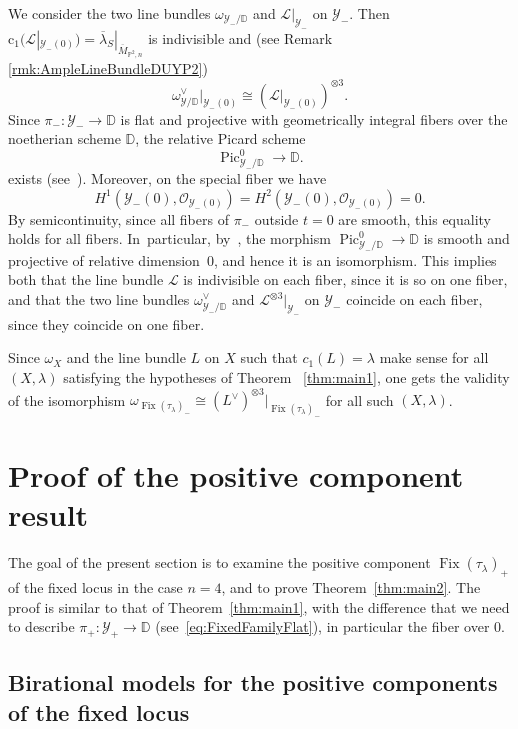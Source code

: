 \documentclass[JEP,XML,SOM,Unicode,published]{cedram}
\newcommand{\DD}{{\mathbb D}}
\newcommand{\PP}{{\mathbb P}}\let\P\PP
\newcommand\cL{\mathcal{L}}
\newcommand\cO{\mathcal{O}}
\newcommand\cY{\mathcal{Y}}
\DeclareMathOperator{\Fix}{Fix}
\DeclareMathOperator{\Pic}{Pic}
\theoremstyle{definition}
\begin{document}
We consider the two line bundles $\omega_{\cY_-/\DD}$ and $\cL |_{\cY_-}$ on $\cY_-$.
Then $\mathrm{c}_1(\cL |_{\cY_{-}(0)})=\overline{\lambda}{}_S|_{\overline{M}_{\PP^2,n}}$ is indivisible and (see Remark \ref{rmk:AmpleLineBundleDUYP2})
\[
\omega_{\cY/\DD}^\vee |_{\cY_{-}(0)} \cong \left(\cL |_{\cY_{-}(0)}\right)^{\otimes 3}.
\]
Since $\pi_-\colon\cY_-\to \DD$ is flat and projective with geometrically integral fibers over the noetherian scheme $\DD$, the relative Picard scheme
\[
\Pic_{\cY_-/\DD}^0\to \DD.
\]
exists (see~\cite[Th.\,4.8]{Kleiman:Picard}).
Moreover, on the special fiber we have
\[
H^1(\cY_{-}(0),\cO_{\cY_{-}(0)})=H^2(\cY_{-}(0),\cO_{\cY_{-}(0)})=0.
\]
By semicontinuity, since all fibers of $\pi_-$ outside $t=0$ are smooth, this equality holds for all fibers. In~particular, by~\cite[Prop.\,5.19]{Kleiman:Picard}, the morphism $\Pic_{\cY_-/\DD}^0\to \DD$ is smooth and projective of relative dimension~0, and hence it is an isomorphism.
This implies both that the line bundle $\cL$ is indivisible on each fiber, since it is so on one fiber, and that the two line bundles $\omega_{\cY_-/\DD}^\vee$ and $\cL^{\otimes 3} |_{\cY_-}$ on $\cY_-$ coincide on each fiber, since they coincide on one fiber.

Since $\omega_X$ and the line bundle $L$ on $X$ such that $c_1(L)=\lambda$ make sense for all $(X,\lambda)$ satisfying the hypotheses of Theorem ~\ref{thm:main1}, one gets the validity of the isomorphism $\omega_{\Fix(\tau_{\lambda})_-}\cong (L^{\vee})^{\otimes 3}\vert_{\Fix(\tau_{\lambda})_-}$ for all such $(X, \lambda)$.

\section{Proof of the positive component result}\label{sec:cubic4folds}

The goal of the present section is to examine the positive component $\Fix(\tau_{\lambda})_+$ of the fixed locus in the case $n=4$, and to prove Theorem~\ref{thm:main2}.
The proof is similar to that of Theorem~\ref{thm:main1}, with the difference that we need to describe $\pi_{+}\colon \cY_{+}\to\DD$ (see~\eqref{eq:FixedFamilyFlat}), in particular the fiber over $0$.

\subsection{Birational models for the positive components of the fixed locus}\label{subsection:SecondComponentDegree2}
\end{document}
